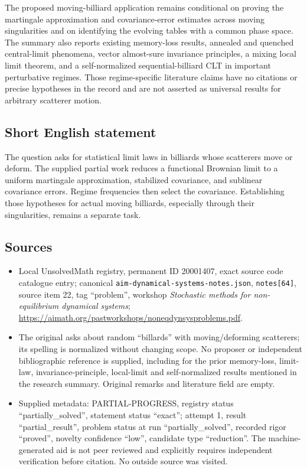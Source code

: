 \documentclass[11pt]{article}
\begin{document}
The proposed moving-billiard application remains conditional on proving the martingale approximation and covariance-error estimates across moving singularities and on identifying the evolving tables with a common phase space. The summary also reports existing memory-loss results, annealed and quenched central-limit phenomena, vector almost-sure invariance principles, a mixing local limit theorem, and a self-normalized sequential-billiard CLT in important perturbative regimes. Those regime-specific literature claims have no citations or precise hypotheses in the record and are not asserted as universal results for arbitrary scatterer motion.
\subsection{Short English statement}
The question asks for statistical limit laws in billiards whose scatterers move or deform. The supplied partial work reduces a functional Brownian limit to a uniform martingale approximation, stabilized covariance, and sublinear covariance errors. Regime frequencies then select the covariance. Establishing those hypotheses for actual moving billiards, especially through their singularities, remains a separate task.
\subsection{Sources}
\begin{itemize}
\item Local UnsolvedMath registry, permanent ID 20001407, exact source code catalogue entry; canonical \texttt{aim-dynamical-systems-notes.json}, \texttt{notes[64]}, source item 22, tag ``problem'', workshop \emph{Stochastic methods for non-equilibrium dynamical systems}; \url{https://aimath.org/pastworkshops/noneqdynsysproblems.pdf}.
\item The original asks about random ``billards'' with moving/deforming scatterers; its spelling is normalized without changing scope. No proposer or independent bibliographic reference is supplied, including for the prior memory-loss, limit-law, invariance-principle, local-limit and self-normalized results mentioned in the research summary. Original remarks and literature field are empty.
\item Supplied metadata: PARTIAL-PROGRESS, registry status ``partially\_solved'', statement status ``exact''; attempt 1, result ``partial\_result'', problem status at run ``partially\_solved'', recorded rigor ``proved'', novelty confidence ``low'', candidate type ``reduction''. The machine-generated aid is not peer reviewed and explicitly requires independent verification before citation. No outside source was visited.
\end{itemize}
\end{document}
